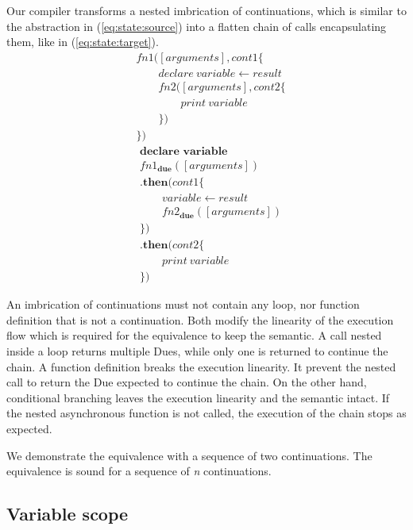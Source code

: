Our compiler transforms a nested imbrication of continuations, which is similar to the abstraction in (\ref{eq:state:source}) into a flatten chain of calls encapsulating them, like in (\ref{eq:state:target}).
\begin{align} \label{eq:state:source}
&fn1([arguments], cont1 \{\nonumber\\
&\qquad  declare ~ variable \leftarrow result\nonumber\\
&\qquad  fn2([arguments], cont2 \{\nonumber\\
&\qquad\qquad    print ~ variable\nonumber\\
&\qquad  \})\nonumber\\
&\})
\end{align}
\begin{align} \label{eq:state:target}
&\textbf{declare variable}\nonumber\\
&fn1_\textbf{due}([arguments])\nonumber\\
&\textbf{.then}(cont1\{\nonumber\\
&\qquad  variable \leftarrow result\nonumber\\
&\qquad  fn2_\textbf{due}([arguments])\nonumber\\
&\})\nonumber\\
&\textbf{.then}(cont2\{\nonumber\\
&\qquad  print ~ variable\nonumber\\
&\})
\end{align}

An imbrication of continuations must not contain any loop, nor function definition that is not a continuation.
Both modify the linearity of the execution flow which is required for the equivalence to keep the semantic.
A call nested inside a loop returns multiple Dues, while only one is returned to continue the chain.
A function definition breaks the execution linearity.
It prevent the nested call to return the Due expected to continue the chain.
On the other hand, conditional branching leaves the execution linearity and the semantic intact.
If the nested asynchronous function is not called, the execution of the chain stops as expected.

We demonstrate the equivalence with a sequence of two continuations.
The equivalence is sound for a sequence of \textit{n} continuations.

\subsection{Variable scope}

